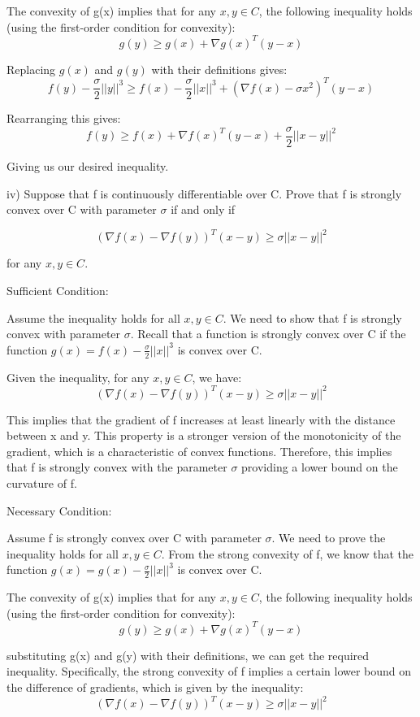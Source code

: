 \documentclass{article}
\begin{document}
The convexity of g(x) implies that for any $x, y \in C$, the following inequality
holds (using the first-order condition for convexity):
\[g(y) \geq g(x) + \nabla g(x)^T (y-x)\]

Replacing $g(x)$ and $g(y)$ with their definitions gives:
\[f(y) - \frac{\sigma}{2}||y||^3 \geq f(x) - \frac{\sigma}{2}||x||^3 + (\nabla f(x) - \sigma x^2)^T (y-x)\]

Rearranging this gives:
\[f(y) \geq f(x) + \nabla f(x)^T (y-x) + \frac{\sigma}{2} ||x-y||^2\]

Giving us our desired inequality.


iv) Suppose that f is continuously differentiable over C. Prove that f
is strongly convex over C with parameter $\sigma$ if and only if

\[(\nabla f(x) - \nabla f(y))^T (x-y) \geq \sigma ||x-y||^2\]

for any $x, y \in C$.


Sufficient Condition:

Assume the inequality holds for all $x, y \in C$. We need to show that f is strongly
convex with parameter $\sigma$. Recall that a function is strongly convex over
C if the function $g(x) = f(x) - \frac{\sigma}{2} ||x||^3$ is convex over C.

Given the inequality, for any $x, y \in C$, we have:
\[(\nabla f(x) - \nabla f(y))^T (x-y) \geq \sigma ||x-y||^2\]

This implies that the gradient of f increases at least linearly with the
distance between x and y. This property is a stronger version of the
monotonicity of the gradient, which is a characteristic of convex functions.
Therefore, this implies that f is strongly convex with the parameter
$\sigma$ providing a lower bound on the curvature of f.


Necessary Condition:

Assume f is strongly convex over C with parameter $\sigma$. We need to prove
the inequality holds for all $x, y \in C$. From the strong convexity of f,
we know that the function $g(x) = g(x) - \frac{\sigma}{2} ||x||^3$
is convex over C.

The convexity of g(x) implies that for any $x, y \in C$, the following inequality
holds (using the first-order condition for convexity):
\[g(y) \geq g(x) + \nabla g(x)^T (y-x)\]

substituting g(x) and g(y) with their definitions,
we can get the required inequality. Specifically, the strong convexity
of f implies a certain lower bound on the difference of gradients, which
is given by the inequality:
\[(\nabla f(x) - \nabla f(y))^T (x-y) \geq \sigma ||x-y||^2\]
\end{document}
